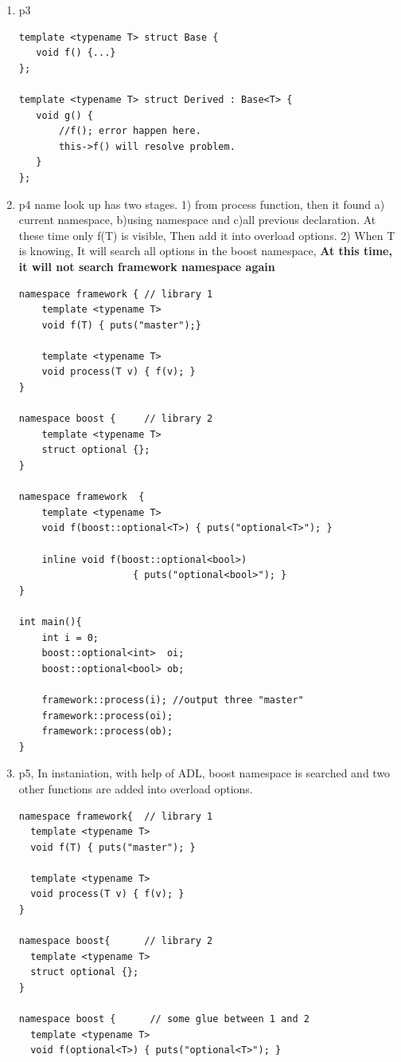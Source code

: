 \documentclass[a4paper,11pt,twoside]{book}
\begin{document}
\begin{itemize}
\begin{enumerate}
\item p3
\begin{lstlisting}[numbers=none]
template <typename T> struct Base {
   void f() {...}
};

template <typename T> struct Derived : Base<T> {
   void g() {
       //f(); error happen here. 
       this->f() will resolve problem.
   }
};
\end{lstlisting}


\item p4 name look up has two stages. 1) from process function, then it found a) current namespace, b)using namespace and c)all previous declaration.  At these time only f(T) is visible, Then add it into overload options.  2) When T is knowing, It will search all options in the boost namespace, \textbf{At this time, it will not search framework namespace again}

\begin{lstlisting}[numbers=none]
namespace framework { // library 1
	template <typename T>
	void f(T) { puts("master");}
 
	template <typename T>
	void process(T v) { f(v); }
}
 
namespace boost {     // library 2
	template <typename T>
	struct optional {};
}
 
namespace framework  {     
	template <typename T>
	void f(boost::optional<T>) { puts("optional<T>"); }
    
	inline void f(boost::optional<bool>) 
	                { puts("optional<bool>"); }
}
 
int main(){
	int i = 0;
	boost::optional<int>  oi;
	boost::optional<bool> ob;
  
	framework::process(i); //output three "master"
	framework::process(oi);
	framework::process(ob);
}
\end{lstlisting}


\item p5, In instaniation, with help of ADL, boost namespace is searched and two other functions are added into overload options.

\begin{lstlisting}[numbers=none]
namespace framework{  // library 1
  template <typename T>
  void f(T) { puts("master"); }
 
  template <typename T>
  void process(T v) { f(v); } 
}
 
namespace boost{      // library 2
  template <typename T>
  struct optional {};
}
 
namespace boost {      // some glue between 1 and 2
  template <typename T>
  void f(optional<T>) { puts("optional<T>"); }
    

\end{lstlisting}
\end{enumerate}
\end{itemize}
\end{document}
